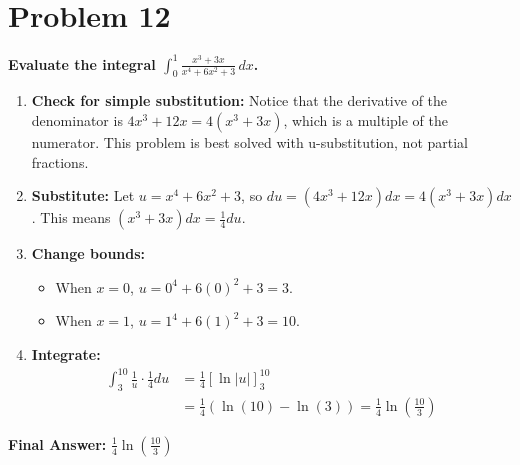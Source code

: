 \documentclass{article}
\begin{document}
\section{Problem 12}
\textbf{Evaluate the integral $\displaystyle\int_0^1 \frac{x^3+3x}{x^4+6x^2+3} \,dx$.}
\begin{enumerate}
    \item \textbf{Check for simple substitution:} Notice that the derivative of the denominator is $4x^3+12x = 4(x^3+3x)$, which is a multiple of the numerator. This problem is best solved with u-substitution, not partial fractions.
    \item \textbf{Substitute:} Let $u=x^4+6x^2+3$, so $du = (4x^3+12x)dx = 4(x^3+3x)dx$.
    This means $(x^3+3x)dx = \frac{1}{4}du$.
    \item \textbf{Change bounds:}
    \begin{itemize}
        \item When $x=0$, $u = 0^4+6(0)^2+3 = 3$.
        \item When $x=1$, $u = 1^4+6(1)^2+3 = 10$.
    \end{itemize}
    \item \textbf{Integrate:}
    \begin{align*}
    \int_3^{10} \frac{1}{u} \cdot \frac{1}{4}du &= \frac{1}{4} \left[ \ln|u| \right]_3^{10} \\
    &= \frac{1}{4}(\ln(10) - \ln(3)) = \frac{1}{4}\ln\left(\frac{10}{3}\right)
    \end{align*}
\end{enumerate}
\textbf{Final Answer:} $\displaystyle\frac{1}{4}\ln\left(\frac{10}{3}\right)$
\end{document}
